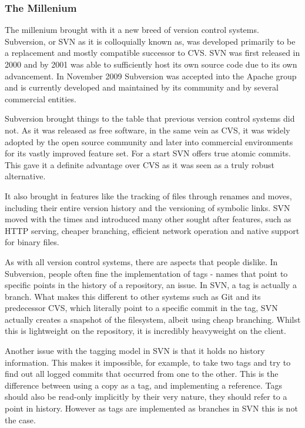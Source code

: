 \subsubsection{The Millenium}
The millenium brought with it a new breed of version control systems.  Subversion, or SVN as it is colloquially known as, was developed primarily to be a replacement and mostly compatible successor to CVS.  SVN was first released in 2000 and by 2001 was able to sufficiently host its own source code due to its own advancement.  In November 2009 Subversion was accepted into the Apache group and is currently developed and maintained by its community and by several commercial entities.

Subversion brought things to the table that previous version control systems did not.  As it was released as free software, in the same vein as CVS, it was widely adopted by the open source community and later into commercial environments for its vastly improved feature set.  For a start SVN offers true atomic commits.  This gave it a definite advantage over CVS as it was seen as a truly robust alternative.

It also brought in features like the tracking of files through renames and moves, including their entire version history and the versioning of symbolic links.  SVN moved with the times and introduced many other sought after features, such as HTTP serving, cheaper branching, efficient network operation and native support for binary files.  

As with all version control systems, there are aspects that people dislike.  In Subversion, people often fine the implementation of tags - names that point to specific points in the history of a repository, an issue.  In SVN, a tag is actually a branch.  What makes this different to other systems such as Git and its predecessor CVS, which literally point to a specific commit in the tag, SVN actually creates a snapshot of the filesystem, albeit using cheap branching.  Whilst this is lightweight on the repository, it is incredibly heavyweight on the client.

Another issue with the tagging model in SVN is that it holds no history information.  This makes it impossible, for example, to take two tags and try to find out all logged commits that occurred from one to the other.  This is the difference between using a copy as a tag, and implementing a reference.  Tags should also be read-only implicitly by their very nature, they should refer to a point in history.  However as tags are implemented as branches in SVN this is not the case.

